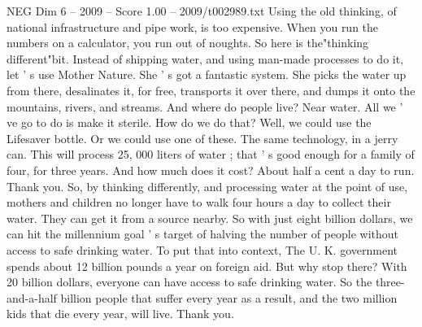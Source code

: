 \begin{textsample}{NEG Dim 6 – 2009 – Score 1.00 – 2009/t002989.txt}
Using the old thinking, of national infrastructure and pipe work, is too expensive.
When you run the numbers on a calculator, you run out of noughts.
So here is the"thinking different"bit.
Instead of shipping water, and using man-made processes to do it, let ' s use Mother Nature.
She ' s got a fantastic system.
She picks the water up from there, desalinates it, for free, transports it over there, and dumps it onto the mountains, rivers, and streams.
And where do people live?
Near water.
All we ' ve go to do is make it sterile.
How do we do that?
Well, we could use the Lifesaver bottle.
Or we could use one of these.
The same technology, in a jerry can.
This will process 25, 000 liters of water ; that ' s good enough for a family of four, for three years.
And how much does it cost?
About half a cent a day to run.
Thank you.
So, by thinking differently, and processing water at the point of use, mothers and children no longer have to walk four hours a day to collect their water.
They can get it from a source nearby.
So with just eight billion dollars, we can hit the millennium goal ' s target of halving the number of people without access to safe drinking water.
To put that into context, The U.
K. government spends about 12 billion pounds a year on foreign aid.
But why stop there?
With 20 billion dollars, everyone can have access to safe drinking water.
So the three-and-a-half billion people that suffer every year as a result, and the two million kids that die every year, will live.
Thank you.

\end{textsample}
